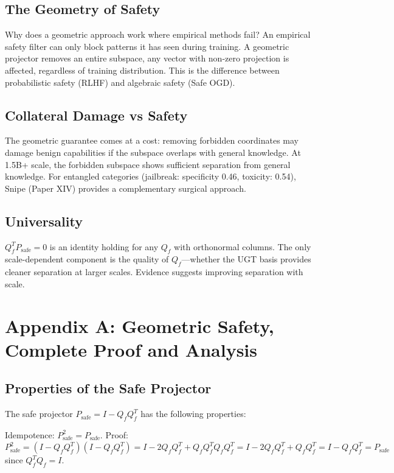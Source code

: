 \documentclass[11pt]{article}
\begin{document}
\subsection{The Geometry of Safety}
Why does a geometric approach work where empirical methods fail? An empirical safety filter can only block patterns it has seen during training. A geometric projector removes an entire subspace, any vector with non-zero projection is affected, regardless of training distribution. This is the difference between probabilistic safety (RLHF) and algebraic safety (Safe OGD).

\subsection{Collateral Damage vs Safety}
The geometric guarantee comes at a cost: removing forbidden coordinates may damage benign capabilities if the subspace overlaps with general knowledge. At 1.5B+ scale, the forbidden subspace shows sufficient separation from general knowledge. For entangled categories (jailbreak: specificity 0.46, toxicity: 0.54), Snipe (Paper XIV) provides a complementary surgical approach.

\subsection{Universality}
$Q_f^T P_{\mathrm{safe}} = 0$ is an identity holding for any $Q_f$ with orthonormal columns. The only scale-dependent component is the quality of $Q_f$---whether the UGT basis provides cleaner separation at larger scales. Evidence suggests improving separation with scale.


\section{Appendix A: Geometric Safety, Complete Proof and Analysis}

\subsection{Properties of the Safe Projector}

The safe projector $P_{\mathrm{safe}} = I - Q_f Q_f^T$ has the following properties:

Idempotence: $P_{\mathrm{safe}}^2 = P_{\mathrm{safe}}$. Proof: $P_{\mathrm{safe}}^2 = (I - Q_f Q_f^T)(I - Q_f Q_f^T) = I - 2Q_f Q_f^T + Q_f Q_f^T Q_f Q_f^T = I - 2Q_f Q_f^T + Q_f Q_f^T = I - Q_f Q_f^T = P_{\mathrm{safe}}$ since $Q_f^T Q_f = I$.
\end{document}
